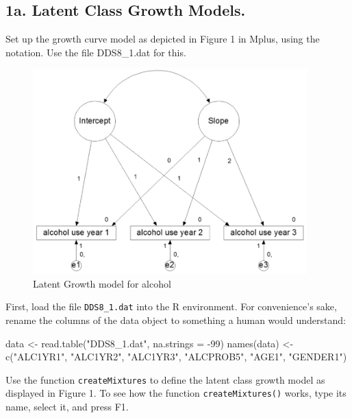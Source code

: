 \documentclass[
]{book}
\newenvironment{Shaded}{\begin{snugshade}}{\end{snugshade}}
\newcommand{\AttributeTok}[1]{\textcolor[rgb]{0.77,0.63,0.00}{#1}}
\newcommand{\DecValTok}[1]{\textcolor[rgb]{0.00,0.00,0.81}{#1}}
\newcommand{\FunctionTok}[1]{\textcolor[rgb]{0.00,0.00,0.00}{#1}}
\newcommand{\NormalTok}[1]{#1}
\newcommand{\OtherTok}[1]{\textcolor[rgb]{0.56,0.35,0.01}{#1}}
\newcommand{\SpecialCharTok}[1]{\textcolor[rgb]{0.00,0.00,0.00}{#1}}
\newcommand{\StringTok}[1]{\textcolor[rgb]{0.31,0.60,0.02}{#1}}
\begin{document}
\hypertarget{a.-latent-class-growth-models.}{%
\subsection{1a. Latent Class Growth Models.}\label{a.-latent-class-growth-models.}}

Set up the growth curve model as depicted in Figure 1 in Mplus, using the \textbar{} notation. Use the file DDS8\_1.dat for this.

\begin{figure}
\centering
\includegraphics[width=4.16667in,height=\textheight]{./Materials/Figure1_lgm_alcohol.png}
\caption{Latent Growth model for alcohol}
\end{figure}

First, load the file \texttt{DDS8\_1.dat} into the R environment. For convenience's sake, rename the columns of the data object to something a human would understand:

\begin{Shaded}
\begin{Highlighting}[]
\NormalTok{data }\OtherTok{\textless{}{-}} \FunctionTok{read.table}\NormalTok{(}\StringTok{"DDS8\_1.dat"}\NormalTok{, }\AttributeTok{na.strings =} \SpecialCharTok{{-}}\DecValTok{99}\NormalTok{)}
\FunctionTok{names}\NormalTok{(data) }\OtherTok{\textless{}{-}} \FunctionTok{c}\NormalTok{(}\StringTok{"ALC1YR1"}\NormalTok{, }\StringTok{"ALC1YR2"}\NormalTok{, }\StringTok{"ALC1YR3"}\NormalTok{,}
                 \StringTok{"ALCPROB5"}\NormalTok{, }\StringTok{"AGE1"}\NormalTok{, }\StringTok{"GENDER1"}\NormalTok{)}
\end{Highlighting}
\end{Shaded}

Use the function \texttt{createMixtures} to define the latent class growth model as displayed in Figure 1. To see how the function \texttt{createMixtures()} works, type its name, select it, and press F1.
\end{document}
